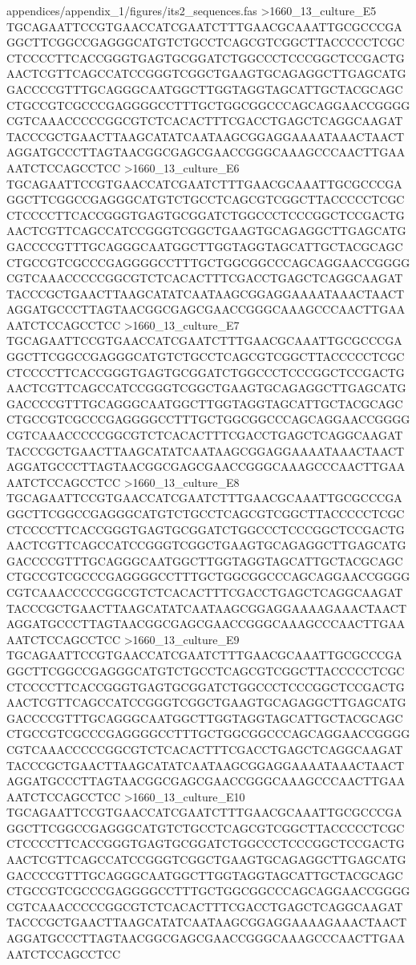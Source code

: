 {\begin{filecontents*}{appendices/appendix_1/figures/its2_sequences.fas}
>1660_13_culture_E5
TGCAGAATTCCGTGAACCATCGAATCTTTGAACGCAAATTGCGCCCGAGGCTTCGGCCGAGGGCATGTCTGCCTCAGCGTCGGCTTACCCCCTCGCCTCCCCTTCACCGGGTGAGTGCGGATCTGGCCCTCCCGGCTCCGACTGAACTCGTTCAGCCATCCGGGTCGGCTGAAGTGCAGAGGCTTGAGCATGGACCCCGTTTGCAGGGCAATGGCTTGGTAGGTAGCATTGCTACGCAGCCTGCCGTCGCCCGAGGGGCCTTTGCTGGCGGCCCAGCAGGAACCGGGGCGTCAAACCCCCGGCGTCTCACACTTTCGACCTGAGCTCAGGCAAGATTACCCGCTGAACTTAAGCATATCAATAAGCGGAGGAAAATAAACTAACTAGGATGCCCTTAGTAACGGCGAGCGAACCGGGCAAAGCCCAACTTGAAAATCTCCAGCCTCC
>1660_13_culture_E6
TGCAGAATTCCGTGAACCATCGAATCTTTGAACGCAAATTGCGCCCGAGGCTTCGGCCGAGGGCATGTCTGCCTCAGCGTCGGCTTACCCCCTCGCCTCCCCTTCACCGGGTGAGTGCGGATCTGGCCCTCCCGGCTCCGACTGAACTCGTTCAGCCATCCGGGTCGGCTGAAGTGCAGAGGCTTGAGCATGGACCCCGTTTGCAGGGCAATGGCTTGGTAGGTAGCATTGCTACGCAGCCTGCCGTCGCCCGAGGGGCCTTTGCTGGCGGCCCAGCAGGAACCGGGGCGTCAAACCCCCGGCGTCTCACACTTTCGACCTGAGCTCAGGCAAGATTACCCGCTGAACTTAAGCATATCAATAAGCGGAGGAAAATAAACTAACTAGGATGCCCTTAGTAACGGCGAGCGAACCGGGCAAAGCCCAACTTGAAAATCTCCAGCCTCC
>1660_13_culture_E7
TGCAGAATTCCGTGAACCATCGAATCTTTGAACGCAAATTGCGCCCGAGGCTTCGGCCGAGGGCATGTCTGCCTCAGCGTCGGCTTACCCCCTCGCCTCCCCTTCACCGGGTGAGTGCGGATCTGGCCCTCCCGGCTCCGACTGAACTCGTTCAGCCATCCGGGTCGGCTGAAGTGCAGAGGCTTGAGCATGGACCCCGTTTGCAGGGCAATGGCTTGGTAGGTAGCATTGCTACGCAGCCTGCCGTCGCCCGAGGGGCCTTTGCTGGCGGCCCAGCAGGAACCGGGGCGTCAAACCCCCGGCGTCTCACACTTTCGACCTGAGCTCAGGCAAGATTACCCGCTGAACTTAAGCATATCAATAAGCGGAGGAAAATAAACTAACTAGGATGCCCTTAGTAACGGCGAGCGAACCGGGCAAAGCCCAACTTGAAAATCTCCAGCCTCC
>1660_13_culture_E8
TGCAGAATTCCGTGAACCATCGAATCTTTGAACGCAAATTGCGCCCGAGGCTTCGGCCGAGGGCATGTCTGCCTCAGCGTCGGCTTACCCCCTCGCCTCCCCTTCACCGGGTGAGTGCGGATCTGGCCCTCCCGGCTCCGACTGAACTCGTTCAGCCATCCGGGTCGGCTGAAGTGCAGAGGCTTGAGCATGGACCCCGTTTGCAGGGCAATGGCTTGGTAGGTAGCATTGCTACGCAGCCTGCCGTCGCCCGAGGGGCCTTTGCTGGCGGCCCAGCAGGAACCGGGGCGTCAAACCCCCGGCGTCTCACACTTTCGACCTGAGCTCAGGCAAGATTACCCGCTGAACTTAAGCATATCAATAAGCGGAGGAAAAGAAACTAACTAGGATGCCCTTAGTAACGGCGAGCGAACCGGGCAAAGCCCAACTTGAAAATCTCCAGCCTCC
>1660_13_culture_E9
TGCAGAATTCCGTGAACCATCGAATCTTTGAACGCAAATTGCGCCCGAGGCTTCGGCCGAGGGCATGTCTGCCTCAGCGTCGGCTTACCCCCTCGCCTCCCCTTCACCGGGTGAGTGCGGATCTGGCCCTCCCGGCTCCGACTGAACTCGTTCAGCCATCCGGGTCGGCTGAAGTGCAGAGGCTTGAGCATGGACCCCGTTTGCAGGGCAATGGCTTGGTAGGTAGCATTGCTACGCAGCCTGCCGTCGCCCGAGGGGCCTTTGCTGGCGGCCCAGCAGGAACCGGGGCGTCAAACCCCCGGCGTCTCACACTTTCGACCTGAGCTCAGGCAAGATTACCCGCTGAACTTAAGCATATCAATAAGCGGAGGAAAATAAACTAACTAGGATGCCCTTAGTAACGGCGAGCGAACCGGGCAAAGCCCAACTTGAAAATCTCCAGCCTCC
>1660_13_culture_E10
TGCAGAATTCCGTGAACCATCGAATCTTTGAACGCAAATTGCGCCCGAGGCTTCGGCCGAGGGCATGTCTGCCTCAGCGTCGGCTTACCCCCTCGCCTCCCCTTCACCGGGTGAGTGCGGATCTGGCCCTCCCGGCTCCGACTGAACTCGTTCAGCCATCCGGGTCGGCTGAAGTGCAGAGGCTTGAGCATGGACCCCGTTTGCAGGGCAATGGCTTGGTAGGTAGCATTGCTACGCAGCCTGCCGTCGCCCGAGGGGCCTTTGCTGGCGGCCCAGCAGGAACCGGGGCGTCAAACCCCCGGCGTCTCACACTTTCGACCTGAGCTCAGGCAAGATTACCCGCTGAACTTAAGCATATCAATAAGCGGAGGAAAAGAAACTAACTAGGATGCCCTTAGTAACGGCGAGCGAACCGGGCAAAGCCCAACTTGAAAATCTCCAGCCTCC

\end{filecontents*}}
